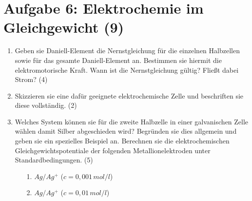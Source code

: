 \section*{Aufgabe 6: Elektrochemie im Gleichgewicht (9)}
\begin{enumerate}

\item Geben sie Daniell-Element die Nernstgleichung für die einzelnen Halbzellen sowie
für das gesamte Daniell-Element an. Bestimmen sie hiermit die elektromotorische Kraft. Wann ist die Nernstgleichung
gültig? Fließt dabei Strom? (4)

\item Skizzieren sie eine dafür geeignete elektrochemische Zelle und beschriften sie
diese vollständig. (2)

\item Welches System können sie für die zweite Halbzelle in einer galvanischen Zelle
wählen damit Silber abgeschieden wird? Begründen sie dies allgemein und geben sie
ein spezielles Beispiel an. Berechnen sie die elektrochemischen Gleichgewichtspotentiale
der folgenden Metallionelektroden unter Standardbedingungen. (5)
\begin{itemize}
\item[1.] \(Ag/Ag^+\) (\(c=0,001\, mol/l\))
\item[2.] \(Ag/Ag^+\) (\(c=0,01\, mol/l\))
\end{itemize}

\end{enumerate}